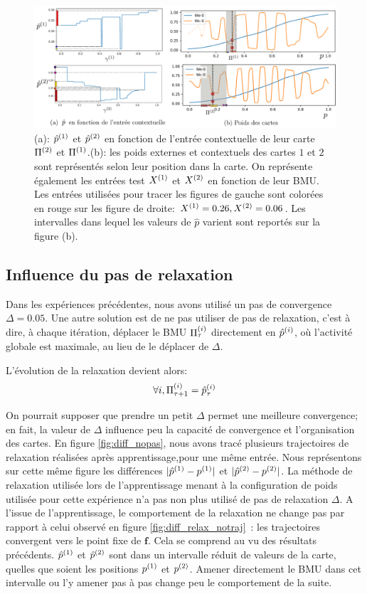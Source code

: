 \documentclass[../main]{subfiles}
\begin{document}
\begin{figure}
	\includegraphics[width=\textwidth]{am_w_006_noinp}
	\caption{(a): $\hat{p}^{({1})}$ et $\hat{p}^{({2})}$ en fonction de l'entrée contextuelle de leur carte $\Pi^{({2})}$ et $\Pi^{({1})}$.(b): les poids externes et contextuels des cartes $1$ et $2$ sont représentés selon leur position dans la carte. On représente également les entrées test $X^{({1})}$ et $X^{({2})}$ en fonction de leur BMU. Les entrées utilisées pour tracer les figures de gauche sont colorées en rouge sur les figure de droite: $X^{({1})}=0.26,X^{({2})}=0.06$. Les intervalles dans lequel les valeurs de $\hat{p}$ varient sont reportés sur la figure (b).}
	\label{fig:w006}
	\end{figure}

\subsection{Influence du pas de relaxation}

Dans les expériences précédentes, nous avons utilisé un pas de convergence $\Delta=0.05$.
Une autre solution est de ne pas utiliser de pas de relaxation, c'est à dire, à chaque itération, déplacer le BMU $\Pi^{({i})}_\tau$ directement en $\hat{p}^{({i})}$, où l'activité globale est maximale, au lieu de le déplacer de $\Delta$.

L'évolution de la relaxation devient alors:
\begin{equation}
\forall i, \Pi^{({i})}_{\tau+1} = \hat{p}^{({i})}_{\tau}
\end{equation}

On pourrait supposer que prendre un petit $\Delta$ permet une meilleure convergence; en fait, la valeur de $\Delta$ influence peu la capacité de convergence et l'organisation des cartes.
En figure \ref{fig:diff_nopas}, nous avons tracé plusieurs trajectoires de relaxation réalisées après apprentissage,pour une même entrée. 
Nous représentons sur cette même figure les différences $\lvert \hat{p}^{({1})} - p^{({1})} \rvert$ et $\lvert \hat{p}^{({2})} - p^{({2})} \rvert$.
La méthode de relaxation utilisée lors de l'apprentissage menant à la configuration de poids utilisée pour cette expérience n'a pas non plus utilisé de pas de relaxation $\Delta$.
A l'issue de l'apprentissage, le comportement de la relaxation ne change pas par rapport à celui observé en figure \ref{fig:diff_relax_notraj}~: les trajectoires convergent vers le point fixe de $\mathbf{f}$.
Cela se comprend au vu des résultats précédents. $\hat{p}^{({1})}$ et $\hat{p}^{({2})}$ sont dans un intervalle réduit de valeurs de la carte, quelles que soient les positions $p^{({1})}$ et $p^{({2})}$. 
Amener directement le BMU dans cet intervalle ou l'y amener pas à pas change peu le comportement de la suite. 
\end{document}
